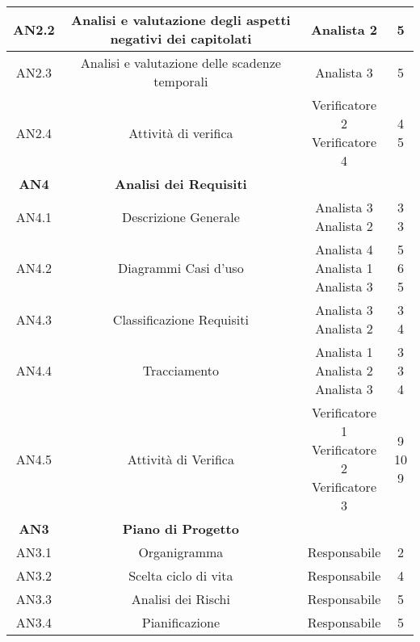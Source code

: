 \documentclass{scalatekids-article}
\begin{document}
\begin{center}
\begin{tabular}{| c | c | c | c |}
    AN2.2 & Analisi e valutazione degli aspetti negativi dei capitolati & Analista 2 & 5\\
    \hline
    AN2.3 & Analisi e valutazione delle scadenze temporali & Analista 3 & 5\\
    \hline
    AN2.4 & Attività di verifica & \multiLineCell[t]{Verificatore 2\\Verificatore 4} & \multiLineCell[t]{4\\5}\\
    \hline
    \textbf{AN4} & \textbf{Analisi dei Requisiti} & &\\
    \hline
    AN4.1 & Descrizione Generale & \multiLineCell[t]{Analista 3\\Analista 2} & \multiLineCell[t]{3\\3}\\
    \hline
    AN4.2 & Diagrammi Casi d'uso & \multiLineCell[t]{Analista 4\\Analista 1\\Analista 3} & \multiLineCell[t]{5\\6\\5}\\
    \hline
    AN4.3 & Classificazione Requisiti & \multiLineCell[t]{Analista 3\\Analista 2} & \multiLineCell[t]{3\\4}\\
    \hline
    AN4.4 & Tracciamento & \multiLineCell[t]{Analista 1\\Analista 2\\Analista 3} & \multiLineCell[t]{3\\3\\4}\\
    \hline
    AN4.5 & Attività di Verifica & \multiLineCell[t]{Verificatore 1\\Verificatore 2\\Verificatore 3} & \multiLineCell[t]{9\\10\\9}\\
    \hline
    \textbf{AN3} & \textbf{Piano di Progetto} & &\\
    \hline
    AN3.1 & Organigramma & Responsabile & 2\\
    \hline
    AN3.2 & Scelta ciclo di vita & Responsabile & 4\\
    \hline
    AN3.3 & Analisi dei Rischi & Responsabile & 5\\
    \hline
    AN3.4 & Pianificazione & Responsabile & 5\\
    \hline

\end{tabular}
\end{center}
\end{document}
